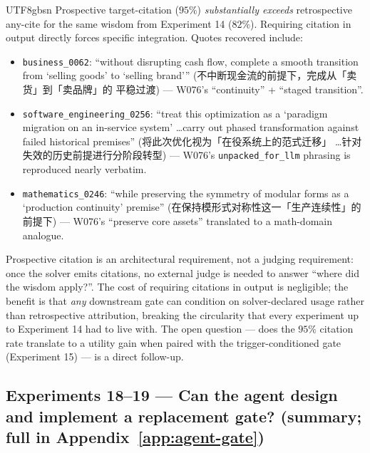\documentclass{article}
\begin{document}
\begin{CJK*}{UTF8}{gbsn}
Prospective target-citation (\(95\%\)) \emph{substantially
exceeds} retrospective any-cite for the same wisdom from
Experiment 14 (\(82\%\)). Requiring citation in output directly
forces specific integration. Quotes recovered include:

\begin{itemize}[leftmargin=1.2em, topsep=2pt, itemsep=2pt]
  \item \texttt{business\_0062}: ``without disrupting cash flow,
    complete a smooth transition from `selling goods' to `selling
    brand''' (不中断现金流的前提下，完成从「卖货」到「卖品牌」的
    平稳过渡) — W076's
    ``continuity'' + ``staged transition''.
  \item \texttt{software\_engineering\_0256}: ``treat this
    optimization as a `paradigm migration on an in-service system'
    \ldots carry out phased transformation against failed
    historical premises'' (将此次优化视为「在役系统上的范式迁移」
    \ldots 针对失效的历史前提进行分阶段转型) — W076's
    \texttt{unpacked\_for\_llm}
    phrasing is reproduced nearly verbatim.
  \item \texttt{mathematics\_0246}: ``while preserving the
    symmetry of modular forms as a `production continuity' premise''
    (在保持模形式对称性这一「生产连续性」的前提下) — W076's
    ``preserve core assets'' translated to a math-domain analogue.
\end{itemize}

\noindent Prospective citation is an architectural requirement,
not a judging requirement: once the solver emits citations, no
external judge is needed to answer ``where did the wisdom
apply?''. The cost of requiring citations in output is
negligible; the benefit is that \emph{any} downstream gate can
condition on solver-declared usage rather than retrospective
attribution, breaking the circularity that every experiment up
to Experiment 14 had to live with. The open question — does the
\(95\%\) citation rate translate to a utility gain when paired
with the trigger-conditioned gate (Experiment 15) — is a direct
follow-up.

\subsection{Experiments 18--19 — Can the agent design and implement
a replacement gate? (summary; full in Appendix~\ref{app:agent-gate})}
\label{sec:meta}


\end{CJK*}
\end{document}
